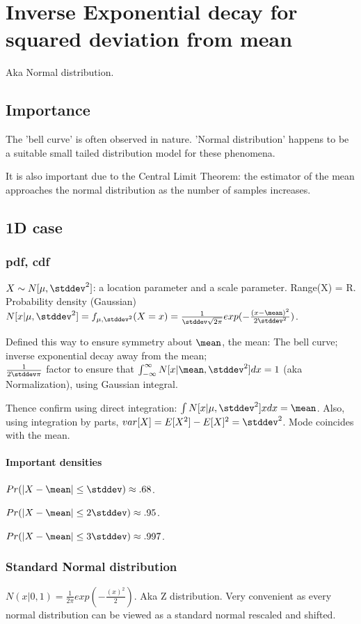 \documentclass[oneside, article]{memoir}
\begin{document}
\section{Inverse Exponential decay for squared deviation from mean}
Aka Normal distribution.

\subsection{Importance}
The 'bell curve' is often observed in nature. 'Normal distribution' happens to be a suitable small tailed distribution model for these phenomena.

It is also important due to the Central Limit Theorem: the estimator of the mean approaches the normal distribution as the number of samples increases.

\subsection{1D case}
\subsubsection{pdf, cdf}
$X \sim N[\mu,\stddev^{2}]$: a location parameter and a scale parameter. Range(X) = R. Probability density (Gaussian) \\
$N[x | \mu,\stddev^{2}] = f_{\mu, \stddev^{2}}(X=x) = \frac{1}{\stddev \sqrt{2\pi}}exp(-\frac{(x-\mean)^{2}}{2\stddev^{2}})$.

Defined this way to ensure symmetry about $\mean$, the mean: The bell curve; inverse exponential decay away from the mean;\\ $\frac{1}{2\stddev \pi}$ factor to ensure that $\int_{-\infty}^{\infty} N[x | \mean,\stddev^{2}]dx = 1$ (aka Normalization), using Gaussian integral.

Thence confirm using direct integration: $\int N[x | \mu,\stddev^{2}] x dx = \mean$. Also, using integration by parts, $var[X] = E[X^{2}]-E[X]^{2} = \stddev^{2}$. Mode coincides with the mean.

\paragraph{Important densities}
$Pr(|X - \mean| \leq \stddev) \approx .68 $.

$Pr(|X - \mean| \leq 2\stddev) \approx .95 $.

$Pr(|X - \mean| \leq 3\stddev) \approx .997 $.

\subsubsection{Standard Normal distribution}
$N(x|0,1) = \frac{1}{2 \pi}exp(-\frac{(x)^{2}}{2})$. Aka Z distribution. Very convenient as every normal distribution can be viewed as a standard normal rescaled and shifted.
\end{document}
